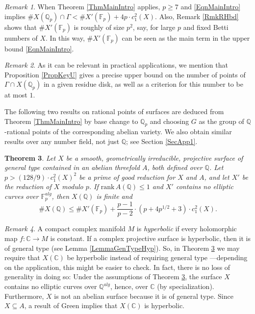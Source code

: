 \documentclass[11pt]{amsart}
\newtheorem{theorem}{Theorem}[section]
\theoremstyle{remark}
\newtheorem{remark}[theorem]{Remark}
\numberwithin{equation}{section}
\newcommand{\C}{\mathbb{C}}
\newcommand{\F}{\mathbb{F}}
\newcommand{\Q}{\mathbb{Q}}
\newcommand{\rk}{\mathrm{rank}\,}
\begin{document}
\begin{remark}\label{RmkRH4p} When Theorem \ref{ThmMainIntro} applies, $p\ge 7$ and \eqref{EqnMainIntro} implies $ \# X(\Q_p)\cap \Gamma< \# X'(\F_p) + 4p\cdot c_1^2(X)$. Also, Remark \ref{RmkRHbd} shows  that $\# X'(\F_p)$ is roughly of size $p^2$, say, for large $p$ and fixed Betti numbers of $X$. In this way, $\# X'(\F_p)$ can be seen as the main term in the upper bound \eqref{EqnMainIntro}.
\end{remark}
\begin{remark} As it can be relevant in practical applications, we mention that Proposition \ref{PropKeyU} gives a precise upper bound on the number of points of $\Gamma\cap X(\Q_p)$ in a given residue disk, as well as a criterion for this number to be at most $1$. 
\end{remark}

The following two results on rational points of surfaces are deduced from Theorem \ref{ThmMainIntro} by base change to $\Q_p$ and choosing $G$ as the group of $\Q$-rational points of the corresponding abelian variety. We also obtain similar results over any number field, not just $\Q$; see Section \ref{SecApp1}.
\begin{theorem}\label{ThmIntroA} Let $X$ be a smooth, geometrically irreducible, projective surface of general type contained in an abelian threefold $A$, both defined over $\Q$. Let $p> (128/9)\cdot  c_1^2(X)^2$ be a prime of good reduction for $X$ and $A$, and let $X'$ be the reduction of $X$ modulo $p$.  If $\rk A(\Q)\le 1$ and $X'$ contains no elliptic curves over $\F_p^{alg}$, then $X(\Q)$ is finite and
$$
\#X(\Q) \le \# X'(\F_p) + \frac{p-1}{p-2}\cdot \left(p+4p^{1/2} + 3\right)\cdot c_1^2(X).
$$ 
\end{theorem}
\begin{remark}\label{RmkHyp1} A compact complex manifold $M$ is \emph{hyperbolic} if every holomorphic map $f:\C\to M$ is constant. If a complex projective surface is hyperbolic, then it is of general type (see Lemma \ref{LemmaGenTypeHyp}). So, in Theorem \ref{ThmIntroA} we may require that $X(\C)$ be hyperbolic instead of requiring general type ---depending on the application, this might be easier to check. In fact, there is no loss of generality in doing so: Under the assumptions of Theorem \ref{ThmIntroA}, the surface $X$ contains no elliptic curves over $\Q^{alg}$, hence, over  $\C$ (by specialization). Furthermore, $X$ is not an abelian surface because it is of general type. Since $X\subseteq A$, a result of Green \cite{Green} implies that $X(\C)$ is hyperbolic.
\end{remark}
\end{document}
